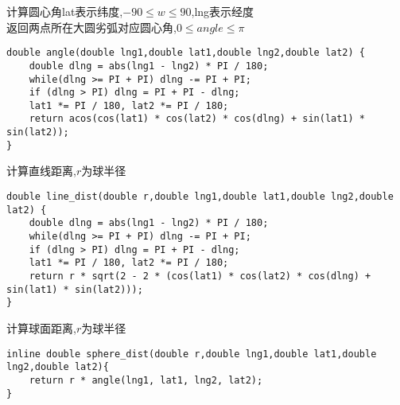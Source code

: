 计算圆心角lat表示纬度,$-90\leq w\leq 90$,lng表示经度 \\
返回两点所在大圆劣弧对应圆心角,$0\leq angle \leq \pi$
\begin{lstlisting}
double angle(double lng1,double lat1,double lng2,double lat2) {
	double dlng = abs(lng1 - lng2) * PI / 180; 
	while(dlng >= PI + PI) dlng -= PI + PI;
	if (dlng > PI) dlng = PI + PI - dlng;
	lat1 *= PI / 180, lat2 *= PI / 180;
	return acos(cos(lat1) * cos(lat2) * cos(dlng) + sin(lat1) * sin(lat2));
}
\end{lstlisting}

计算直线距离,$r$为球半径
\begin{lstlisting}
double line_dist(double r,double lng1,double lat1,double lng2,double lat2) {
	double dlng = abs(lng1 - lng2) * PI / 180; 
	while(dlng >= PI + PI) dlng -= PI + PI;
	if (dlng > PI) dlng = PI + PI - dlng;
	lat1 *= PI / 180, lat2 *= PI / 180;
	return r * sqrt(2 - 2 * (cos(lat1) * cos(lat2) * cos(dlng) + sin(lat1) * sin(lat2)));
}
\end{lstlisting}

计算球面距离,$r$为球半径 
\begin{lstlisting}
inline double sphere_dist(double r,double lng1,double lat1,double lng2,double lat2){
	return r * angle(lng1, lat1, lng2, lat2);
}
\end{lstlisting}

